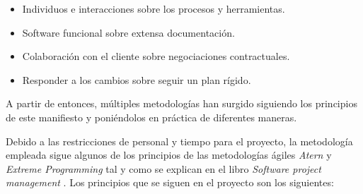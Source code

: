 \begin{itemize}
	\item Individuos e interacciones sobre los procesos y herramientas.
	\item Software funcional sobre extensa documentación.
	\item Colaboración con el cliente sobre negociaciones contractuales.
	\item Responder a los cambios sobre seguir un plan rígido.
\end{itemize}

A partir de entonces, múltiples metodologías han surgido siguiendo los principios de este manifiesto y poniéndolos en práctica de diferentes maneras.

Debido a las restricciones de personal y tiempo para el proyecto, la metodología empleada sigue algunos de los principios de las metodologías ágiles \textit{Atern} y \textit{Extreme Programming} tal y como se explican en el libro \textit{Software project management} \cite{hughes2009software}. Los principios que se siguen en el proyecto son los siguientes:

